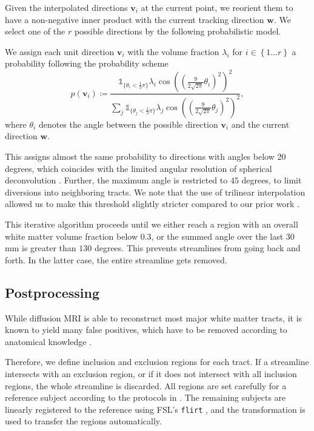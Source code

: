 Given the interpolated directions $\mathbf{v}_i$ at the current point, we
reorient them to have a non-negative inner product with the current tracking
direction $\mathbf{w}$. We select one of the $r$ possible directions by the
following probabilistic model.

We assign each unit direction $\mathbf{v}_i$ with the volume fraction
$\lambda_i$ for $i \in \left\{ 1\dots r \right\}$ a probability following the probability
scheme 
\[
	p \left( \mathbf{v}_i \right) \coloneqq \frac{ \mathbb{1}_{\lbrace\theta_i <
		\frac{1}{3} \pi \rbrace} \lambda_i \cos \left( \left( \frac{9}{2\sqrt{2
\pi}} \theta_i \right)^2 \right)^2}{\sum_j \mathbb{1}_{\lbrace\theta_j <
		\frac{1}{3} \pi \rbrace} \lambda_j \cos \left( \left( \frac{9}{2\sqrt{2
\pi}} \theta_j \right)^2 \right)^2 }, 
\]
where $\theta_i$ denotes the angle between the possible direction $\mathbf{v}_i$
and the current direction $\mathbf{w}$. 

This assigns almost the same probability to directions with angles below 20 degrees, which coincides with the limited angular resolution of
spherical deconvolution \cite{TOURNIER20071459}. Further, the maximum angle is
restricted to $45$ degrees, to limit diversions into neighboring tracts. We note that the use of trilinear interpolation allowed us to make this threshold slightly stricter compared to our prior work \cite{Gruen:2021}.

This iterative algorithm proceeds until we either reach a region with an overall white matter volume fraction below $0.3$, or the summed angle over the last $30$ mm is greater than
$130$ degrees. This prevents streamlines from going back and forth. In the latter case,
the entire streamline gets removed. 

\subsection{Postprocessing}
While diffusion MRI is able to reconstruct most major white
matter tracts, it is known to yield many false
positives, which have to be removed according to anatomical knowledge
\cite{MaierHein:2017}. %

Therefore, we define inclusion and exclusion regions for each tract. If a streamline intersects with an exclusion region, or if it  does not intersect with all inclusion regions, the whole streamline is discarded. All regions
are set carefully for a reference subject according to the protocols in
\cite{Wakana:2007}.
The remaining subjects are linearly registered to the reference using FSL's \texttt{flirt} \cite{FSL}, and the transformation is used to transfer the regions automatically.

